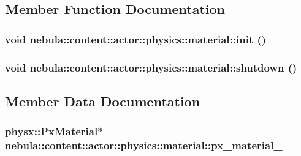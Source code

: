 \subsection{Member Function Documentation}
\hypertarget{classnebula_1_1content_1_1actor_1_1physics_1_1material_ab66ce559d5f555910a456b0b9f8c6da0}{
\subsubsection[{init}]{\setlength{\rightskip}{0pt plus 5cm}void nebula::content::actor::physics::material::init ()}}
\label{classnebula_1_1content_1_1actor_1_1physics_1_1material_ab66ce559d5f555910a456b0b9f8c6da0}
\hypertarget{classnebula_1_1content_1_1actor_1_1physics_1_1material_ad568cfeea6afe00ad0b653bef4bf5a7b}{
\subsubsection[{shutdown}]{\setlength{\rightskip}{0pt plus 5cm}void nebula::content::actor::physics::material::shutdown ()}}
\label{classnebula_1_1content_1_1actor_1_1physics_1_1material_ad568cfeea6afe00ad0b653bef4bf5a7b}


\subsection{Member Data Documentation}
\hypertarget{classnebula_1_1content_1_1actor_1_1physics_1_1material_a7b9868ba375cb4abac9c9217f69e62ee}{
\subsubsection[{px\_\-material\_\-}]{\setlength{\rightskip}{0pt plus 5cm}physx::PxMaterial$\ast$ {\bf nebula::content::actor::physics::material::px\_\-material\_\-}}}
\label{classnebula_1_1content_1_1actor_1_1physics_1_1material_a7b9868ba375cb4abac9c9217f69e62ee}


